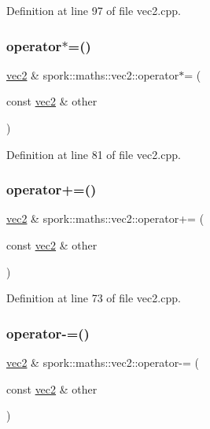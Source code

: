 Definition at line 97 of file vec2.\+cpp.

\mbox{\label{structspork_1_1maths_1_1vec2_af5a50810095db0445b4ad5fb9b06b90b}} 
\subsubsection{\texorpdfstring{operator$\ast$=()}{operator*=()}}
{\footnotesize\ttfamily \hyperlink{structspork_1_1maths_1_1vec2}{vec2} \& spork\+::maths\+::vec2\+::operator$\ast$= (\begin{DoxyParamCaption}\item[{const \hyperlink{structspork_1_1maths_1_1vec2}{vec2} \&}]{other }\end{DoxyParamCaption})}



Definition at line 81 of file vec2.\+cpp.

\mbox{\label{structspork_1_1maths_1_1vec2_a5a4c857c0a9d6ae8566b3b923f588800}} 
\subsubsection{\texorpdfstring{operator+=()}{operator+=()}}
{\footnotesize\ttfamily \hyperlink{structspork_1_1maths_1_1vec2}{vec2} \& spork\+::maths\+::vec2\+::operator+= (\begin{DoxyParamCaption}\item[{const \hyperlink{structspork_1_1maths_1_1vec2}{vec2} \&}]{other }\end{DoxyParamCaption})}



Definition at line 73 of file vec2.\+cpp.

\mbox{\label{structspork_1_1maths_1_1vec2_a717c7f2437ffa1142baaf2c1c4deae89}} 
\subsubsection{\texorpdfstring{operator-\/=()}{operator-=()}}
{\footnotesize\ttfamily \hyperlink{structspork_1_1maths_1_1vec2}{vec2} \& spork\+::maths\+::vec2\+::operator-\/= (\begin{DoxyParamCaption}\item[{const \hyperlink{structspork_1_1maths_1_1vec2}{vec2} \&}]{other }\end{DoxyParamCaption})}



